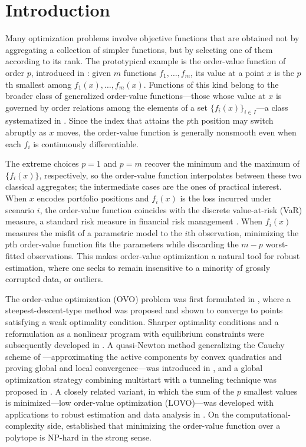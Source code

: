 \documentclass[11pt]{article}
\begin{document}
\section{Introduction} \label{sec:intro}

Many optimization problems involve objective functions that are obtained not
by aggregating a collection of simpler functions, but by selecting one of them
according to its rank. The prototypical example is the order-value function of
order $p$, introduced in \cite{dunder1,dunder2}: given $m$ functions
$f_1,\dots,f_m$, its value at a point $x$ is the $p$th smallest among
$f_1(x),\dots,f_m(x)$. Functions of this kind belong to the broader class of
generalized order-value functions---those whose value at $x$ is governed by
order relations among the elements of a set $\{f_i(x)\}_{i\in I}$---a class
systematized in \cite{mtop}. Since the index that attains the $p$th position
may switch abruptly as $x$ moves, the order-value function is generally
nonsmooth even when each $f_i$ is continuously differentiable.

The extreme choices $p=1$ and $p=m$ recover the minimum and the maximum of
$\{f_i(x)\}$, respectively, so the order-value function interpolates between
these two classical aggregates; the intermediate cases are the ones of
practical interest. When $x$ encodes portfolio positions and $f_i(x)$ is the
loss incurred under scenario $i$, the order-value function coincides with the
discrete value-at-risk (VaR) measure, a standard risk measure in financial
risk management \cite{jorion}. When $f_i(x)$ measures the misfit of a
parametric model to the $i$th observation, minimizing the $p$th order-value
function fits the parameters while discarding the $m-p$ worst-fitted
observations. This makes order-value optimization a natural tool for robust
estimation, where one seeks to remain insensitive to a minority of grossly
corrupted data, or outliers.

The order-value optimization (OVO) problem was first formulated in
\cite{dunder1}, where a steepest-descent-type method was proposed and shown to
converge to points satisfying a weak optimality condition. Sharper optimality
conditions and a reformulation as a nonlinear program with equilibrium
constraints were subsequently developed in \cite{dunder2}. A quasi-Newton
method generalizing the Cauchy scheme of \cite{dunder1}---approximating the
active components by convex quadratics and proving global and local
convergence---was introduced in \cite{yano1}, and a global optimization
strategy combining multistart with a tunneling technique was proposed in
\cite{salva}. A closely related variant, in which the sum of the $p$ smallest
values is minimized---low order-value optimization (LOVO)---was developed with
applications to robust estimation and data analysis in \cite{yano2}. On the
computational-complexity side, \cite{jiang} established that minimizing the
order-value function over a polytope is NP-hard in the strong sense.
\end{document}
